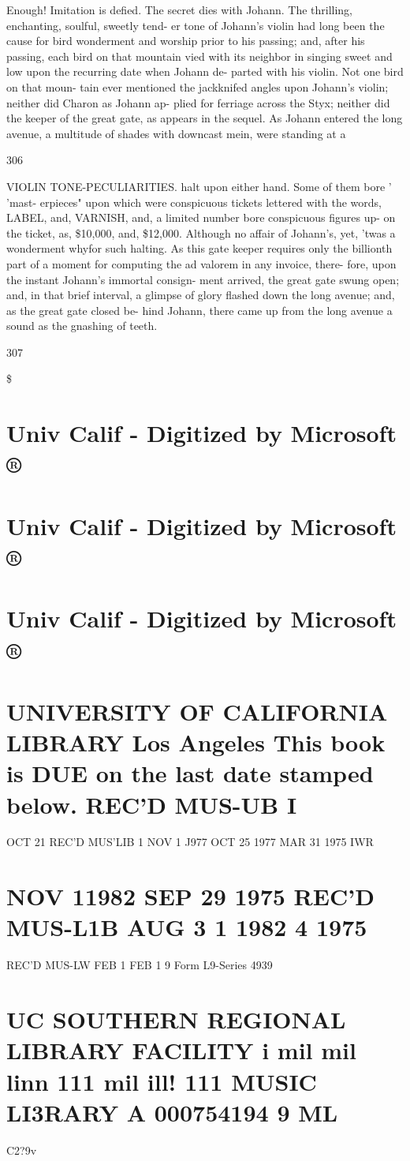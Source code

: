 \documentclass{article}
\begin{document}
Enough! Imitation is defied. The secret dies with Johann. The thrilling, enchanting, soulful, sweetly tend- er tone of Johann's violin had long been the cause for bird wonderment and worship prior to his passing; and, after his passing, each bird on that mountain vied with its neighbor in singing sweet and low upon the recurring date when Johann de- parted with his violin. Not one bird on that moun- tain ever mentioned the jackknifed angles upon Johann's violin; neither did Charon as Johann ap- plied for ferriage across the Styx; neither did the keeper of the great gate, as appears in the sequel. As Johann entered the long avenue, a multitude of shades with downcast mein, were standing at a

306

VIOLIN TONE-PECULIARITIES. halt upon either hand. Some of them bore ' 'mast- erpieces" upon which were conspicuous tickets lettered with the words, LABEL, and, VARNISH, and, a limited number bore conspicuous figures up- on the ticket, as, \$10,000, and, \$12,000. Although no affair of Johann's, yet, 'twas a wonderment whyfor such halting. As this gate keeper requires only the billionth part of a moment for computing the ad valorem in any invoice, there- fore, upon the instant Johann's immortal consign- ment arrived, the great gate swung open; and, in that brief interval, a glimpse of glory flashed down the long avenue; and, as the great gate closed be- hind Johann, there came up from the long avenue a sound as the gnashing of teeth.

307

\$

\section*{Univ Calif - Digitized by Microsoft ®}
\section*{Univ Calif - Digitized by Microsoft ®}
\section*{Univ Calif - Digitized by Microsoft ®}
\section*{UNIVERSITY OF CALIFORNIA LIBRARY Los Angeles This book is DUE on the last date stamped below. REC'D MUS-UB I}
OCT 21 REC'D MUS'LIB 1 NOV 1 J977 OCT 25 1977 MAR 31 1975 IWR

\section*{NOV 11982 SEP 29 1975 REC'D MUS-L1B AUG 3 1 1982 4 1975}
REC'D MUS-LW FEB 1 FEB 1 9 Form L9-Series 4939

\section*{UC SOUTHERN REGIONAL LIBRARY FACILITY i mil mil linn 111 mil ill! 111 MUSIC LI3RARY A 000754194 9 ML}
C2?9v
\end{document}

